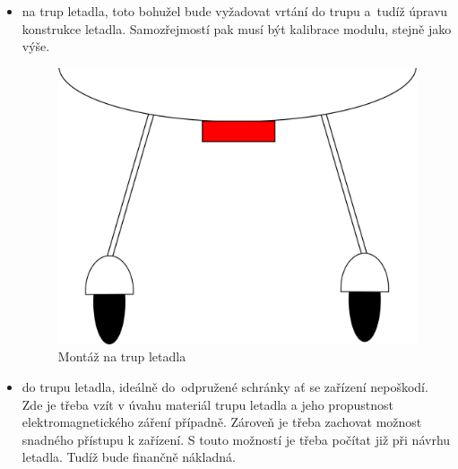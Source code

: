 \begin{itemize}
			\item na trup letadla, toto bohužel bude vyžadovat vrtání do trupu a~tudíž úpravu konstrukce letadla. Samozřejmostí pak musí být kalibrace modulu, stejně jako výše.
			
			\begin{figure}[H]
				\begin{center}
					\includegraphics[scale=0.5]{obrazky-figures/umisteni_na_trup.png}
					\caption{Montáž na trup letadla}
					\label{navrh::umisteni_bricho}
				\end{center}
			\end{figure}
			
			\item do trupu letadla, ideálně do~odpružené schránky ať se zařízení nepoškodí. Zde je třeba vzít v úvahu materiál trupu letadla a jeho propustnost elektromagnetického záření případně. Zároveň je třeba zachovat možnost snadného přístupu k zařízení. S touto možností je třeba počítat již při návrhu letadla. Tudíž bude finančně nákladná.
			

\end{itemize}
